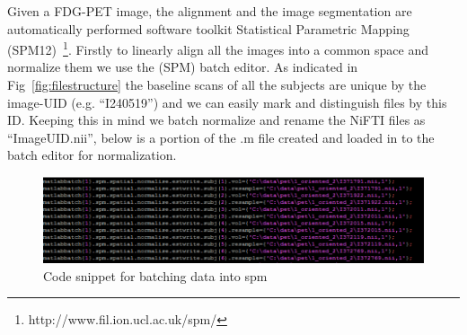 Given a FDG-PET image, the alignment and the image segmentation are automatically performed  software toolkit Statistical Parametric Mapping (SPM12)~\citep{penny2011statistical}\footnote{http://www.fil.ion.ucl.ac.uk/spm/}. Firstly to linearly align all the images into a common space and normalize them we use the (SPM) batch editor. As indicated in Fig~\ref{fig:filestructure} the baseline scans of all the subjects are unique by the image-UID (e.g. ``I240519'') and we can easily mark and distinguish files by this ID. Keeping this in mind we batch normalize and rename the NiFTI files as ``ImageUID.nii'', below is a portion of the .m file created and loaded in to the batch editor for normalization. 
\begin{figure}[h]
	\centering
	\includegraphics[width=\linewidth]{figures/batching}
	\caption[Code Snippet for Batching Data into SPM]{Code snippet for batching data into spm}
	\label{fig:batching}
\end{figure}

